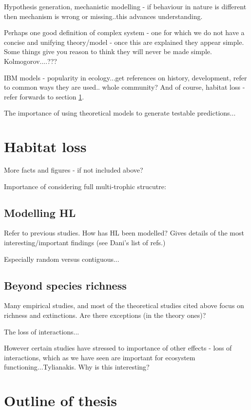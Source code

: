 Hypothesis generation, mechanistic modelling - if behaviour in nature is different then mechanism is wrong or missing..this advances understanding.

Perhaps one good definition of complex system - one for which we do not have a concise and unifying theory/model - once this are explained they appear simple. Some things give you reason to think they will never be made simple. Kolmogorov....???

IBM models - popularity in ecology...get references on history, development, refer to common ways they are used.. whole community? And of course, habitat loss - refer forwards to section \ref{sec:intro_habitat_loss}. 

The importance of using theoretical models to generate testable predictions...

\section{Habitat loss}
\label{sec:intro_habitat_loss}

More facts and figures - if not included above?

Importance of considering full multi-trophic strucutre: \cite{sole2006ecological}

\subsection{Modelling HL}
\label{sec:intro_modelling_HL}

Refer to previous studies. How has HL been modelled? Gives details of the most interesting/important findings (see Dani's list of refs.)

Especially random versus contiguous...

\subsection{Beyond species richness}
\label{sec:intro_beyond}

Many empirical studies, and most of the theoretical studies cited above focus on richness and extinctions. Are there exceptions (in the theory ones)?

The loss of interactions...

However certain studies have stressed to importance of other effects - loss of interactions, which as we have seen are important for ecosystem functioning...Tylianakis. Why is this interesting?

\section{Outline of thesis}
\label{sec:intro_outline}

